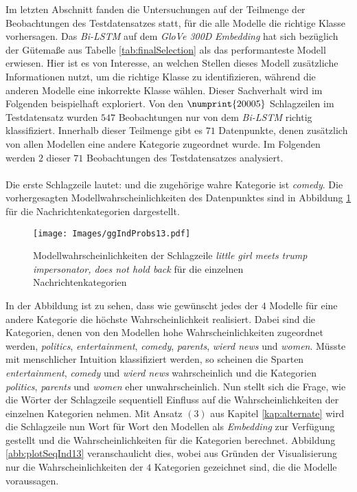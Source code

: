 \documentclass[a4paper,11pt]{article}
\begin{document}
Im letzten Abschnitt fanden die Untersuchungen auf der Teilmenge der Beobachtungen des Testdatensatzes statt, für die alle Modelle die richtige Klasse vorhersagen. Das \textit{Bi-LSTM} auf dem \textit{GloVe 300D} \textit{Embedding} hat sich bezüglich der Gütemaße aus Tabelle \ref{tab:finalSelection} als das performanteste Modell erwiesen. Hier ist es von Interesse, an welchen Stellen dieses Modell zusätzliche Informationen nutzt, um die richtige Klasse zu identifizieren, während die anderen Modelle eine inkorrekte Klasse wählen. Dieser Sachverhalt wird im Folgenden beispielhaft exploriert. Von den $\numprint{20005}$ Schlagzeilen im Testdatensatz wurden $547$ Beobachtungen nur von dem \textit{Bi-LSTM} richtig klassifiziert. Innerhalb dieser Teilmenge gibt es $71$ Datenpunkte, denen zusätzlich von allen Modellen eine andere Kategorie zugeordnet wurde. Im Folgenden werden $2$ dieser $71$ Beobachtungen des Testdatensatzes analysiert. \\
\\
Die erste Schlagzeile lautet:  und die zugehörige wahre Kategorie ist \textit{comedy}. Die vorhergesagten Modellwahrscheinlichkeiten des Datenpunktes sind in Abbildung \ref{abb:IndProbs13}  für die Nachrichtenkategorien dargestellt.

\begin{figure}[ht]
    \centering
\texttt{[image: Images/ggIndProbs13.pdf]} 
\caption{Modellwahrscheinlichkeiten der Schlagzeile \textit{little girl meets trump impersonator, does not hold back} für die einzelnen Nachrichtenkategorien}
\label{abb:IndProbs13}
\end{figure}

In der Abbildung ist zu sehen, dass wie gewünscht jedes der $4$ Modelle für eine andere Kategorie die höchste Wahrscheinlichkeit realisiert. Dabei sind die Kategorien, denen von den Modellen hohe Wahrscheinlichkeiten zugeordnet werden, \textit{politics}, \textit{entertainment}, \textit{comedy}, \textit{parents}, \textit{wierd news} und \textit{women}. Müsste mit menschlicher Intuition klassifiziert werden, so scheinen die Sparten \textit{entertainment}, \textit{comedy} und \textit{wierd news} wahrscheinlich und die Kategorien \textit{politics}, \textit{parents} und \textit{women} eher unwahrscheinlich. Nun stellt sich die Frage, wie die Wörter der Schlagzeile sequentiell Einfluss auf die Wahrscheinlichkeiten der einzelnen Kategorien nehmen. Mit Ansatz $(3)$ aus Kapitel \ref{kap:alternate} wird die Schlagzeile nun Wort für Wort den Modellen als \textit{Embedding} zur Verfügung gestellt und die Wahrscheinlichkeiten für die Kategorien berechnet. Abbildung \ref{abb:plotSeqInd13} veranschaulicht dies, wobei aus Gründen der Visualisierung nur die Wahrscheinlichkeiten der $4$ Kategorien gezeichnet sind, die die Modelle voraussagen.
\end{document}
